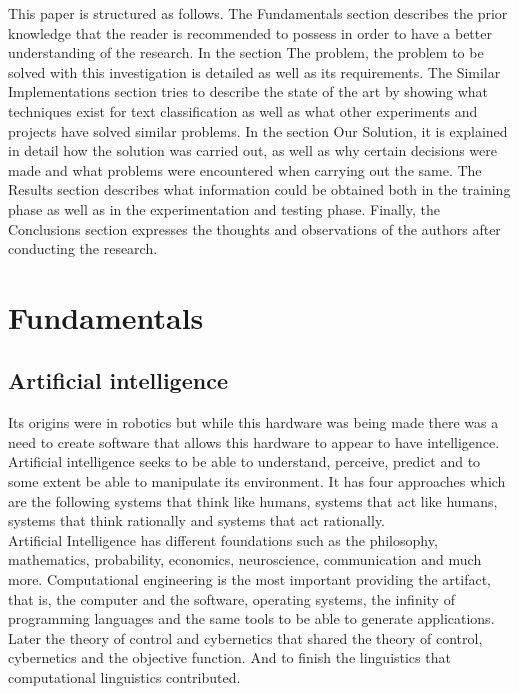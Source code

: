 \documentclass[sigconf,12pt,review=false,natbib=false]{acmart}
\begin{document}
This paper is structured as follows. The Fundamentals section describes the prior knowledge that the
reader is recommended to possess in order to have a better understanding of the research. In the
section The problem, the problem to be solved with this investigation is detailed as well as its
requirements. The Similar Implementations section tries to describe the state of the art by showing
what techniques exist for text classification as well as what other experiments and projects have
solved similar problems. In the section Our Solution, it is explained in detail how the solution was
carried out, as well as why certain decisions were made and what problems were encountered when
carrying out the same. The Results section describes what information could be obtained both in the
training phase as well as in the experimentation and testing phase. Finally, the Conclusions section
expresses the thoughts and observations of the authors after conducting the research. \\

\section{Fundamentals}

\subsection{Artificial intelligence}

Its origins were in robotics but while this hardware was being made there was a need to create software that allows
this hardware to appear to have intelligence. Artificial intelligence seeks to be able to understand, perceive,
predict and to some extent be able to manipulate its environment. It has four approaches which are the following
systems that think like humans, systems that act like humans, systems that think rationally and systems that act
rationally. \\

Artificial Intelligence has different foundations such as the philosophy, mathematics, probability, economics,
neuroscience, communication and much more.
Computational engineering is the most important providing the artifact, that is, the computer and the software,
operating systems, the infinity of programming languages and the same tools to be able to generate applications.
Later the theory of control and cybernetics that shared the theory of control, cybernetics and the objective function.
And to finish the linguistics that computational linguistics contributed. \\
\end{document}
